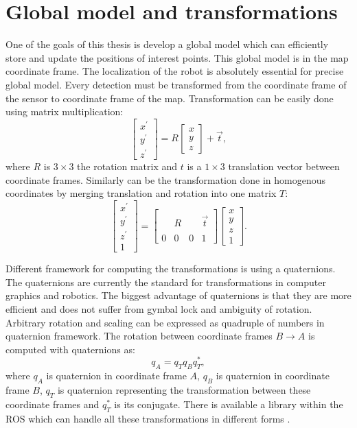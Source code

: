 \section{Global model and transformations}
One of the goals of this thesis is develop a global model which can efficiently store and update the positions of interest points. This global model is in the map coordinate frame. The localization of the robot is absolutely essential for precise global model. Every detection must be transformed from the coordinate frame of the sensor to coordinate frame of the map. Transformation can be easily done using matrix multiplication:
\begin{equation}
\begin{bmatrix}
x^\prime \\
y^\prime \\
z^\prime 
\end{bmatrix}
=
R \begin{bmatrix}
x \\
y \\
z
\end{bmatrix}
+ \vec{t},
\end{equation}
where $R$ is $3\times3$ the rotation matrix and $t$ is a $1\times3$ translation vector between coordinate frames. Similarly can be the transformation done in homogenous coordinates by merging translation and rotation into one matrix $T$:
\begin{equation}
\begin{bmatrix}
x^\prime \\
y^\prime \\
z^\prime \\
1
\end{bmatrix}
=
\begin{bmatrix}
 & & & \\
 & R & & \vec{t} \\
 & & & \\
 0 & 0 & 0 & 1
\end{bmatrix}
\begin{bmatrix}
x \\
y \\
z \\
1
\end{bmatrix}.
\end{equation}

Different framework for computing the transformations is using a quaternions. The quaternions are currently the standard for transformations in computer graphics and robotics. The biggest advantage of quaternions is that they are more efficient and does not suffer from gymbal lock and ambiguity of rotation. Arbitrary rotation and scaling can be expressed as quadruple of numbers in quaternion framework. The rotation between coordinate frames $B \to A$ is computed with quaternions as:
\begin{equation}
q_A = q_T q_B q_T^*,
\end{equation}
where $q_A$ is quaternion in coordinate frame $A$, $q_B$ is quaternion in coordinate frame $B$, $q_T$ is quaternion representing the transformation between these coordinate frames and $q_T^*$ is its conjugate. There is available a library within the ROS which can handle all these transformations in different forms \cite{tf}. 

